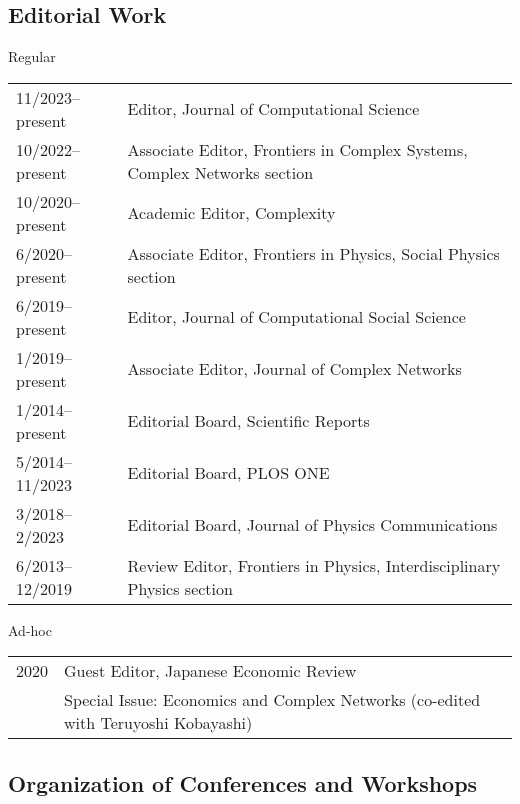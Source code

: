 \documentclass[11pt,letter]{article}
\renewenvironment{itemize}{
  \begin{list}{}{
    \setlength{\leftmargin}{1.5em}
    \setlength{\itemsep}{0.25em}
    \setlength{\parskip}{0pt}
    \setlength{\parsep}{0.25em}
  }
}{
  \end{list}
}
\begin{document}
\subsection*{\bf \normalsize Editorial Work}

\begin{itemize}

\item Regular

\begin{tabular}{ll}
11/2023--present & Editor, Journal of Computational Science\\
10/2022--present & Associate Editor, Frontiers in Complex Systems, Complex Networks section\\
10/2020--present & Academic Editor, Complexity\\
6/2020--present & Associate Editor, Frontiers in Physics, Social Physics section\\
6/2019--present & Editor, Journal of Computational Social Science\\
1/2019--present & Associate Editor, Journal of Complex Networks\\
1/2014--present & Editorial Board, Scientific Reports\\
5/2014--11/2023 & Editorial Board, PLOS ONE\\
3/2018--2/2023 & Editorial Board, Journal of Physics Communications\\
6/2013--12/2019 & Review Editor, Frontiers in Physics, Interdisciplinary Physics section
\end{tabular}

\item Ad-hoc

\begin{tabular}{ll}
2020 & Guest Editor, Japanese Economic Review\\
& Special Issue: Economics and Complex Networks (co-edited with Teruyoshi Kobayashi)
\end{tabular}

\end{itemize}


\subsection*{\bf \normalsize Organization of Conferences and Workshops}
\end{document}
